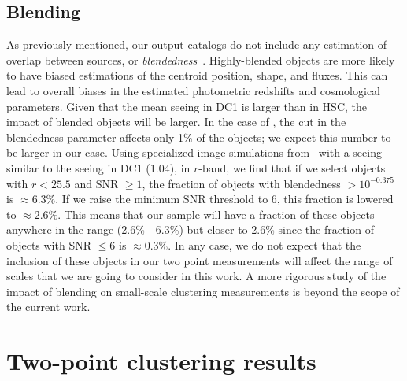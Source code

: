 \documentclass[\docopts]{\docclass}
\begin{document}

\subsection{Blending}
As previously mentioned, our output catalogs do not include any estimation of overlap between sources, or \textit{blendedness}~\citep{2018PASJ...70S...5B}. Highly-blended objects are more likely to have biased estimations of the centroid position, shape, and fluxes. This can lead to overall biases in the estimated photometric redshifts and cosmological parameters. Given that the mean seeing in DC1 is larger than in HSC, the impact of blended objects will be larger. In the case of \citet{2018PASJ...70S..25M}, the cut in the blendedness parameter affects only 1\% of the objects; we expect this number to be larger in our case. Using specialized image simulations from~\citet{Sanchez19} with a seeing similar to the seeing in DC1 (1.04\arcsec), in $r$-band, we find that if we select objects with $r < 25.5$ and SNR $\geq 1$, the fraction of objects with blendedness $ >10^{-0.375}$ is $\approx 6.3\%$. If we raise the minimum SNR threshold to 6, this fraction is lowered to $\approx 2.6\%$. This means that our sample will have a fraction of these objects anywhere in the range (2.6\% - 6.3\%) but closer to 2.6\% since the fraction of objects with SNR $\leq 6$ is $\approx 0.3\%$. In any case, we do not expect that the inclusion of these objects in our two point measurements will affect the range of scales that we are going to consider in this work. A more rigorous study of the impact of blending on small-scale clustering measurements is beyond the scope of the current work.


\section{Two-point clustering results}
\label{sec:results}
\end{document}
